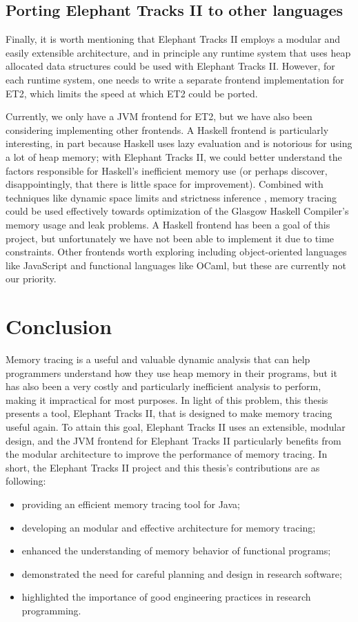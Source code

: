 \subsection{Porting Elephant Tracks II to other languages}
Finally, it is worth mentioning that Elephant Tracks II employs a modular and easily extensible architecture, and in principle any runtime system
that uses heap allocated data structures could be used with Elephant Tracks II. However, for each runtime system, one needs to write a separate frontend
implementation for ET2, which limits the speed at which ET2 could be ported.

Currently, we only have a JVM frontend for ET2, but we have also been considering implementing other frontends. A Haskell frontend is particularly
interesting, in part because Haskell uses lazy evaluation and is notorious for using a lot of heap memory; with Elephant Tracks II, we could better
understand the factors responsible for Haskell's inefficient memory use (or perhaps discover, disappointingly, that there is little space for
improvement). Combined with techniques like dynamic space limits \citep{DynamicSpaceLimits} and strictness inference \citep{Autobahn}, memory tracing could be
used effectively towards optimization of the Glasgow Haskell Compiler's memory usage and leak problems. A Haskell frontend has been a goal of this
project, but unfortunately we have not been able to implement it due to time constraints. Other frontends worth exploring including object-oriented
languages like JavaScript and functional languages like OCaml, but these are currently not our priority.

\section{Conclusion}
Memory tracing is a useful and valuable dynamic analysis that can help programmers understand how they use heap memory in their programs, but it has
also been a very costly and particularly inefficient analysis to perform, making it impractical for most purposes. In light of this problem, this thesis
presents a tool, Elephant Tracks II, that is designed to make memory tracing useful again. To attain this goal, Elephant Tracks II uses an extensible, modular
design, and the JVM frontend for Elephant Tracks II particularly benefits from the modular architecture to improve the performance of memory tracing. In short,
the Elephant Tracks II project and this thesis's contributions are as following:
\begin{itemize}
\item providing an efficient memory tracing tool for Java;
\item developing an modular and effective architecture for memory tracing;
\item enhanced the understanding of memory behavior of functional programs;
\item demonstrated the need for careful planning and design in research software;
\item highlighted the importance of good engineering practices in research programming.
\end{itemize}

